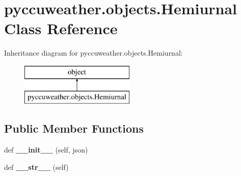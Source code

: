 \hypertarget{classpyccuweather_1_1objects_1_1_hemiurnal}{}\section{pyccuweather.\+objects.\+Hemiurnal Class Reference}
\label{classpyccuweather_1_1objects_1_1_hemiurnal}
Inheritance diagram for pyccuweather.\+objects.\+Hemiurnal\+:\begin{figure}[H]
\begin{center}
\leavevmode
\includegraphics[height=2.000000cm]{classpyccuweather_1_1objects_1_1_hemiurnal}
\end{center}
\end{figure}
\subsection*{Public Member Functions}
\begin{DoxyCompactItemize}
\item 
\hypertarget{classpyccuweather_1_1objects_1_1_hemiurnal_acbdbb672259d2dd0ac557fa389aea6b0}{}def {\bfseries \+\_\+\+\_\+init\+\_\+\+\_\+} (self, json)\label{classpyccuweather_1_1objects_1_1_hemiurnal_acbdbb672259d2dd0ac557fa389aea6b0}

\item 
\hypertarget{classpyccuweather_1_1objects_1_1_hemiurnal_a7b1e66a5d2639f21b6718193a0628573}{}def {\bfseries \+\_\+\+\_\+str\+\_\+\+\_\+} (self)\label{classpyccuweather_1_1objects_1_1_hemiurnal_a7b1e66a5d2639f21b6718193a0628573}

\end{DoxyCompactItemize}
